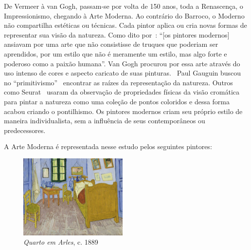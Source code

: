 De Vermeer à van Gogh, passam-se por volta de 150 anos, toda a Renascença, o
Impressionismo, chegando à Arte Moderna. Ao contrário do Barroco, o Moderno
não compartilha estéticas ou técnicas. Cada pintor aplica ou cria novas formas
de representar sua visão da natureza. Como dito por~\citeauthor{gombrich}:
``[os pintores modernos] ansiavam por uma arte que não consistisse de truques
que poderiam ser aprendidos, por um estilo que não é meramente um estilo, mas
algo forte e poderoso como a paixão humana''. Van Gogh procurou por essa arte
através do uso intenso de cores e aspecto caricato de suas
pinturas.~\cite{hulsker} Paul Gauguin buscou no ``primitivismo''~\cite{lovejoy}
encontrar as raízes da representação da natureza. Outros como Seurat~\cite{kemp}
usaram da observação de propriedades físicas da visão cromática para pintar a
natureza como uma coleção de pontos coloridos e dessa forma acabou criando o
pontilhismo. Os pintores modernos criam seu próprio estilo de maneira
individualista, sem a influência de seus contemporâneos ou
predecessores.~\cite{gombrich}

A Arte Moderna é representada nesse estudo pelos seguintes pintores:

\begin{figure}
  \begin{center}
    \includegraphics[width=0.48\textwidth]{figs/vangogh_quarto.png}
  \end{center}
  \caption{\emph{Quarto em Arles}, c. 1889}
  \label{fig:vangogh:quarto}
\end{figure}

